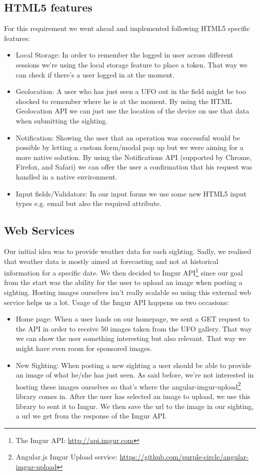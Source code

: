 \documentclass{article}
\begin{document}
\subsection{HTML5 features}
For this requirement we went ahead and implemented following HTML5 specific features:
\begin{itemize}
\item Local Storage: In order to remember the logged in user across different sessions we're using the local storage feature to place a token. That way we can check if there's a user logged in at the moment.
\item Geolocation: A user who has just seen a UFO out in the field might be too shocked to remember where he is at the moment. By using the HTML Geolocation API we can just use the location of the device on use that data when submitting the sighting.
\item Notification: Showing the user that an operation was successful would be possible by letting a custom form/modal pop up but we were aiming for a more native solution. By using the Notifications API (supported by Chrome, Firefox, and Safari) we can offer the user a confirmation that his request was handled in a native environment.
\item Input fields/Validators: In our input forms we use some new HTML5 input types e.g. email but also the required attribute.
\end{itemize}

\subsection{Web Services}
Our initial idea was to provide weather data for each sighting. Sadly, we realised that weather data is mostly aimed at forecasting and not at historical information for a specific date. We then decided to Imgur API\footnote{The Imgur API: \url{http://api.imgur.com}} since our goal from the start was the ability for the user to upload an image when posting a sighting.  Hosting images ourselves isn't really scalable so using this external web service helps us a lot.
Usage of the Imgur API happens on two occasions:
\begin{itemize}
\item Home page: When a user lands on our homepage, we sent a GET request to the API in order to receive 50 images taken from the UFO gallery. That way we can show the user something interesting but also relevant. That way we might have even room for sponsored images.
\item New Sighting: When posting a new sighting a user should be able to provide an image of what he/she has just seen. As said before, we're not interested in hosting these images ourselves so that's where the angular-imgur-upload\footnote{Angular.js Imgur Upload service: \url{https://github.com/purple-circle/angular-imgur-upload}} library comes in. After the user has selected an image to upload, we use this library to sent it to Imgur. We then save the url to the image in our sighting, a url we get from the response of the Imgur API.
\end{itemize}
\end{document}
